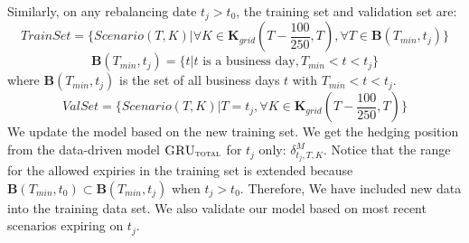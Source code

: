 \documentclass[letterpaper,12pt,titlepage,oneside,final]{book}
\numberwithin{equation}{section}
\theoremstyle{definition}
\newcommand{\modelT}{\textsc{GRU}_{\textsc{total}}}
\begin{document}
\begin{steps}
  
	
	\item Similarly, on any rebalancing date $t_j>t_0$,  the training set  and validation set are: 
		\[TrainSet=\{Scenario(T,K)|\forall K \in \mathbf{K}_{grid}(T-\frac{100}{250},T),\forall T \in \mathbf{B}(T_{min},t_j)\}\]
		\[
		\mathbf{B}(T_{min},t_j)=\{ t|t \text{ is a business day},  T_{min}< t <t_j\} 
		\]
	where $\mathbf{B}(T_{min},t_j)$ is the set of all business days $t$ with  $T_{min}< t <t_j$.
	\[ValSet=\{Scenario(T,K)|T=t_j, \forall K  \in \mathbf{K}_{grid}(T-\frac{100}{250},T)\}\]
	We update the model based on the new training set. We get the hedging position from the data-driven model $\modelT$ for $t_j$ only: $\delta^{M}_{t_j,T,K}$. Notice that  the range for the allowed expiries in the training set is extended because $\mathbf{B}(T_{min},t_0) \subset \mathbf{B}(T_{min},t_j)$ when  $t_j>t_0$. Therefore, We have included new data into the training data set. We also validate our model based on most recent scenarios expiring on $t_j$.
\end{steps}
\end{document}
